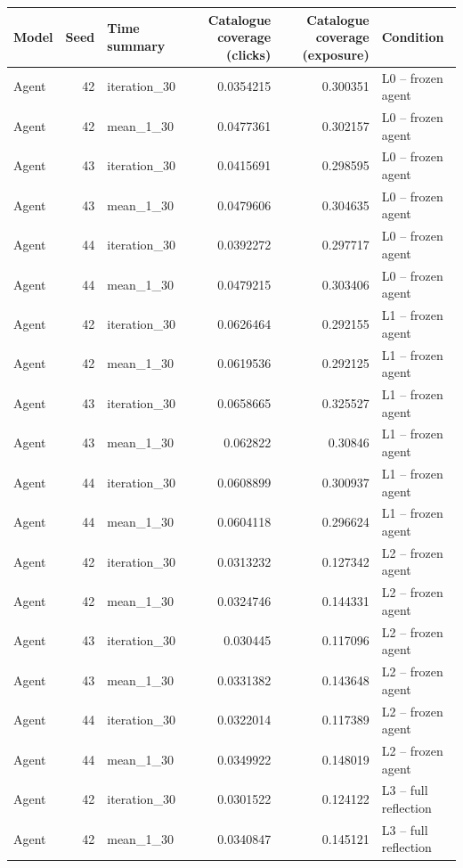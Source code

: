 \begin{table}[htbp!]
\centering
\small
\setlength{\tabcolsep}{3pt}
\renewcommand{\arraystretch}{1.1}
\begin{tabular}{lrlrrl}
\hline
Model & Seed & Time summary & Catalogue coverage (clicks) & Catalogue coverage (exposure) & Condition \\
\hline
Agent & 42 & iteration\_30 & 0.0354215 & 0.300351 & L0 -- frozen agent \\
Agent & 42 & mean\_1\_30 & 0.0477361 & 0.302157 & L0 -- frozen agent \\
Agent & 43 & iteration\_30 & 0.0415691 & 0.298595 & L0 -- frozen agent \\
Agent & 43 & mean\_1\_30 & 0.0479606 & 0.304635 & L0 -- frozen agent \\
Agent & 44 & iteration\_30 & 0.0392272 & 0.297717 & L0 -- frozen agent \\
Agent & 44 & mean\_1\_30 & 0.0479215 & 0.303406 & L0 -- frozen agent \\
Agent & 42 & iteration\_30 & 0.0626464 & 0.292155 & L1 -- frozen agent \\
Agent & 42 & mean\_1\_30 & 0.0619536 & 0.292125 & L1 -- frozen agent \\
Agent & 43 & iteration\_30 & 0.0658665 & 0.325527 & L1 -- frozen agent \\
Agent & 43 & mean\_1\_30 & 0.062822 & 0.30846 & L1 -- frozen agent \\
Agent & 44 & iteration\_30 & 0.0608899 & 0.300937 & L1 -- frozen agent \\
Agent & 44 & mean\_1\_30 & 0.0604118 & 0.296624 & L1 -- frozen agent \\
Agent & 42 & iteration\_30 & 0.0313232 & 0.127342 & L2 -- frozen agent \\
Agent & 42 & mean\_1\_30 & 0.0324746 & 0.144331 & L2 -- frozen agent \\
Agent & 43 & iteration\_30 & 0.030445 & 0.117096 & L2 -- frozen agent \\
Agent & 43 & mean\_1\_30 & 0.0331382 & 0.143648 & L2 -- frozen agent \\
Agent & 44 & iteration\_30 & 0.0322014 & 0.117389 & L2 -- frozen agent \\
Agent & 44 & mean\_1\_30 & 0.0349922 & 0.148019 & L2 -- frozen agent \\
Agent & 42 & iteration\_30 & 0.0301522 & 0.124122 & L3 -- full reflection \\
Agent & 42 & mean\_1\_30 & 0.0340847 & 0.145121 & L3 -- full reflection \\

\end{tabular}
\end{table}
